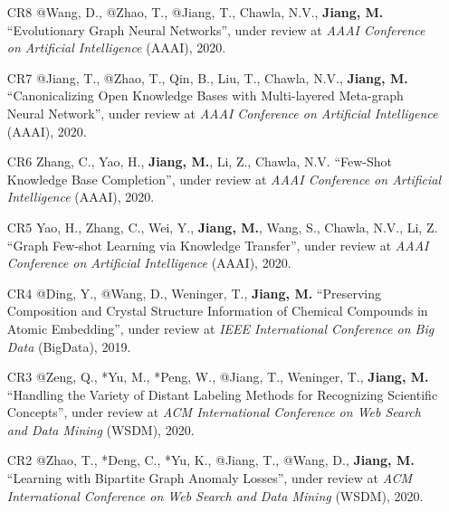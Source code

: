 \documentclass[10pt]{article}
\newenvironment{myindentpar}[1]%
{\begin{list}{}%
         {\setlength{\leftmargin}{#1}}%
         \item[]%
}
{\end{list}}
\newcounter{list}
\begin{document}
\begin{myindentpar}{0.00cm}
\begin{enumerate}[leftmargin=.5cm]


\item[CR8] @Wang, D., @Zhao, T., @Jiang, T., Chawla, N.V., \textbf{Jiang, M.} ``Evolutionary Graph Neural Networks'', under review at \textit{AAAI Conference on Artificial Intelligence} (AAAI), 2020.

\item[CR7] @Jiang, T., @Zhao, T., Qin, B., Liu, T., Chawla, N.V., \textbf{Jiang, M.} ``Canonicalizing Open Knowledge Bases with Multi-layered Meta-graph Neural Network'', under review at \textit{AAAI Conference on Artificial Intelligence} (AAAI), 2020.

\item[CR6] Zhang, C., Yao, H., \textbf{Jiang, M.}, Li, Z., Chawla, N.V. ``Few-Shot Knowledge Base Completion'', under review at \textit{AAAI Conference on Artificial Intelligence} (AAAI), 2020.

\item[CR5] Yao, H., Zhang, C., Wei, Y., \textbf{Jiang, M.}, Wang, S., Chawla, N.V., Li, Z. ``Graph Few-shot Learning via Knowledge Transfer'', under review at \textit{AAAI Conference on Artificial Intelligence} (AAAI), 2020.
	
\item[CR4] @Ding, Y., @Wang, D., Weninger, T., \textbf{Jiang, M.} ``Preserving Composition and Crystal Structure Information of Chemical Compounds in Atomic Embedding'', under review at \textit{IEEE International Conference on Big Data} (BigData), 2019.
	
\item[CR3] @Zeng, Q., *Yu, M., *Peng, W., @Jiang, T., Weninger, T., \textbf{Jiang, M.} ``Handling the Variety of Distant Labeling Methods for Recognizing Scientific Concepts'', under review at \textit{ACM International Conference on Web Search and Data Mining} (WSDM), 2020.

\item[CR2] @Zhao, T., *Deng, C., *Yu, K., @Jiang, T., @Wang, D., \textbf{Jiang, M.} ``Learning with Bipartite Graph Anomaly Losses'', under review at \textit{ACM International Conference on Web Search and Data Mining} (WSDM), 2020.


\end{enumerate}
\end{myindentpar}
\end{document}
